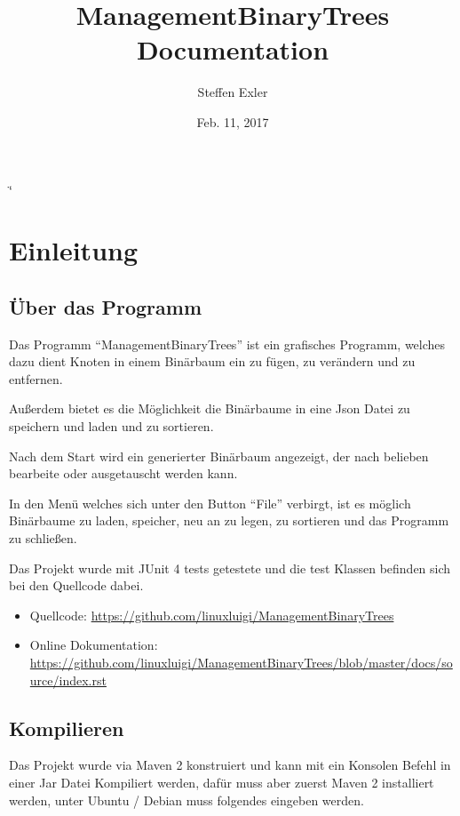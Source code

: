\documentclass[letterpaper,10pt,ngerman]{sphinxmanual}
\title{ManagementBinaryTrees Documentation}
\date{Feb. 11, 2017}
\author{Steffen Exler}
\begin{document}
\if\catcode`\"\active{}\fi
\maketitle
\sphinxtableofcontents
{}\label{\detokenize{index::doc}}



\chapter{Einleitung}
\label{\detokenize{index:einleitung}}\label{\detokenize{index:managementbinarytrees-s-handbuch}}

\section{Über das Programm}
\label{\detokenize{intro::doc}}\label{\detokenize{intro:uber-das-programm}}
Das Programm ``ManagementBinaryTrees'' ist ein grafisches Programm, welches dazu dient Knoten in einem
Binärbaum ein zu fügen, zu verändern und zu entfernen.

Außerdem bietet es die Möglichkeit die Binärbaume
in eine Json Datei zu speichern und laden und zu sortieren.

Nach dem Start wird ein generierter Binärbaum angezeigt, der nach belieben bearbeite oder ausgetauscht
werden kann.

In den Menü welches sich unter den Button ``File'' verbirgt, ist es möglich Binärbaume zu laden, speicher,
neu an zu legen, zu sortieren und das Programm zu schließen.

Das Projekt wurde mit JUnit 4 tests getestete und die test Klassen befinden sich bei den Quellcode dabei.
\begin{itemize}
\item {} 
Quellcode: \url{https://github.com/linuxluigi/ManagementBinaryTrees}

\item {} 
Online Dokumentation: \url{https://github.com/linuxluigi/ManagementBinaryTrees/blob/master/docs/source/index.rst}

\end{itemize}

\noindent{}


\section{Kompilieren}
\label{\detokenize{intro:kompilieren}}
Das Projekt wurde via Maven 2 konstruiert und kann mit ein Konsolen Befehl in einer Jar Datei Kompiliert werden, dafür
muss aber zuerst Maven 2 installiert werden, unter Ubuntu / Debian muss folgendes eingeben werden.
\end{document}
